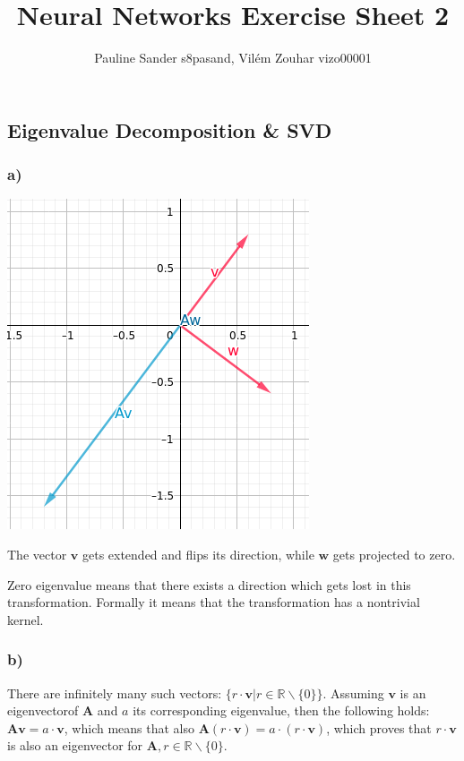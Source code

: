 \documentclass{article}
\title{Neural Networks Exercise Sheet 2}
\author{Pauline Sander s8pasand, Vilém Zouhar vizo00001}
\begin{document}
\maketitle

\setcounter{section}{2}
\subsection{Eigenvalue Decomposition \& SVD}

\subsubsection*{a)}
\begin{center}
    \includegraphics[width=0.5  \linewidth]{img/fig1.png}
\end{center}

The vector $\mathbf{v}$ gets extended and flips its direction, while $\mathbf{w}$ gets projected to zero.

Zero eigenvalue means that there exists a direction which gets lost in this transformation. Formally it means that the transformation has a nontrivial kernel. 

\subsubsection*{b)}

There are infinitely many such vectors: $\{r\cdot \mathbf{v} | r \in \mathbb{R} \backslash \{0\}\}$. Assuming $\mathbf{v}$ is an eigenvectorof $\mathbf{A}$ and $a$ its corresponding eigenvalue, then the following holds: $\mathbf{A} \mathbf{v} = a \cdot \mathbf{v}$, which means that also $\mathbf{A} (r \cdot \mathbf{v}) = a \cdot (r \cdot \mathbf{v})$, which proves that $r \cdot \mathbf{v}$ is also an eigenvector for $\mathbf{A}, r \in \mathbb{R} \backslash \{0\}$.
\end{document}
